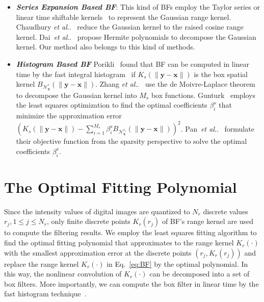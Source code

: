 \documentclass[twocolumn]{el-author}
\makeatletter
\DeclareRobustCommand\onedot{\futurelet\@let@token\@onedot}
\def\@onedot{\ifx\@let@token.\else.\null\fi\xspace}
\def\etal{\emph{et al}\onedot}
\makeatother
\begin{document}
\begin{itemize}
\item \emph{\textbf{Series Expansion Based BF}}: This kind of BFs employ the Taylor series or linear time shiftable kernels~\cite{Chaudhury_SPL_2011} to represent the Gaussian range kernel. Chaudhury \etal~\cite{Chaudhury_TIP_2011} reduce the Gaussian kernel to the raised cosine range kernel. Dai~\etal~\cite{Dai_ET_2014} propose Hermite polynomials to decompose the Gaussian kernel. Our method also belongs to this kind of methods.
  \item \emph{\textbf{Histogram Based BF}} Porikli~\cite{Porikli_2008_CVPR} found that BF can be computed in linear time by the fast integral histogram~\cite{Porikli_CVPR_2005} if $K_s(\| \bm{y} - \bm{x} \|)$ is the box spatial kernel $B_{\mathcal{N}^{r}_{\bm{x}}}(\| \bm{y} - \bm{x} \|)$. Zhang \etal~\cite{Zhang_2012_TIP} use the de Moivre-Laplace theorem to decompose the Gaussian kernel into $M_s$ box functions.  Gunturk~\cite{Gunturk_TIP_2011} employs the least squares optimization to find the optimal coefficients $\beta^s_i$ that minimize the approximation error $(K_s(\| \bm{y} - \bm{x} \|) - \sum_{i = 1}^{M_s} \beta^s_i B_{\mathcal{N}^{r_i}_{\bm{x}}}(\| \bm{y} - \bm{x} \|))^2$. Pan~\etal~\cite{Pan_MPE_2014} formulate their objective function from the sparsity perspective to solve the optimal coefficients $\beta^s_i$.
\end{itemize}
%


\section{The Optimal Fitting Polynomial}

Since the intensity values of digital images are quantized to $N_r$ discrete values $r_j, 1 \leq j \leq N_r$, only finite discrete points $K_r(r_j)$ of BF's range kernel are used to compute the filtering results. We employ the least squares fitting algorithm to find the optimal fitting polynomial that approximates to the range kernel $K_r(\cdot)$ with the smallest approximation error at the discrete points $(r_j, K_r(r_j))$ and replace the range kernel $K_r(\cdot)$ in Eq.~\eqref{eq:BF} by the optimal polynomial. In this way,  the nonlinear convolution of $K_r(\cdot)$ can be decomposed into a set of box filters. More importantly, we can compute the box filter in linear time by the fast histogram technique~\cite{Porikli_CVPR_2005}.
\end{document}
